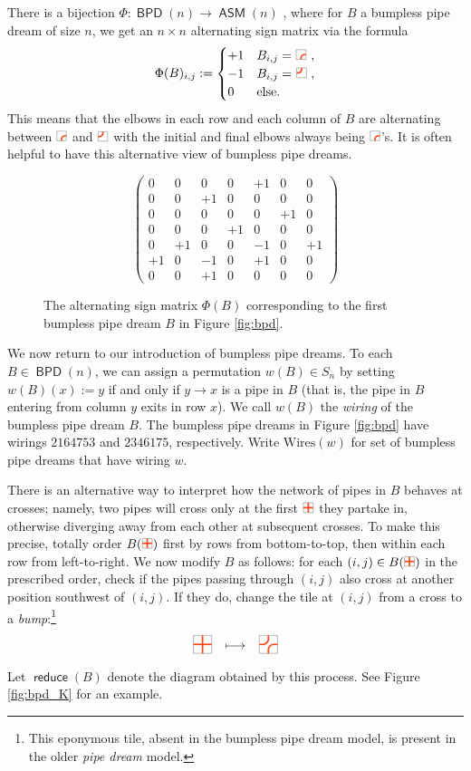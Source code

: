 \documentclass[11pt]{article}
\theoremstyle{definition}
\numberwithin{equation}{section}
\DeclareMathOperator{\reduce}{\mathsf{reduce}}
\DeclareMathOperator{\ASM}{\mathsf{ASM}}
\DeclareMathOperator{\BPD}{\mathsf{BPD}}
\newcommand{\pipecolor}{UForange}
\newcommand{\tilescale}{0.27}
\newcommand{\bigtilescale}{0.5}
\newcommand{\drawSquare}{
    \draw[
        xshift=0.5cm,yshift=0.5cm,
        black,opacity=0.5,thin
    ] (0,0) rectangle (1,1);
}
\newcommand{\drawHorizontal}[2]{
    \draw[color=\pipecolor,very thick]
    (#1-0.5,#2) to (#1+0.5,#2);
}
\newcommand{\drawVertical}[2]{
    \draw[color=\pipecolor,very thick]
    (#1,#2-0.5) to (#1,#2+0.5);
}
\newcommand{\drawCross}[2]{
    \drawHorizontal{#1}{#2}
    \drawVertical{#1}{#2}
}
\newcommand{\drawRelbow}[2]{
    \draw[color=\pipecolor,very thick]
    (#1,#2-0.5) to (#1,#2-0.25) to[bend left] (#1+0.25,#2) to (#1+0.5,#2);
}
\newcommand{\drawJelbow}[2]{
    \draw[color=\pipecolor,very thick]
    (#1,#2+0.5) to (#1,#2+0.25) to[bend left] (#1-0.25,#2) to (#1-0.5,#2);
}
\newcommand{\drawBump}[2]{
    \drawRelbow{#1}{#2}
    \drawJelbow{#1}{#2}
}
\newcommand{\cross}[1][scale=\tilescale,baseline=4pt]{
    \begin{tikzpicture}[#1]
    \drawSquare
    \drawCross11
    \end{tikzpicture}
}
\newcommand{\relbow}[1][scale=\tilescale,baseline=4pt]{
    \begin{tikzpicture}[#1]
    \drawSquare
    \drawRelbow11
    \end{tikzpicture}
}
\newcommand{\jelbow}[1][scale=\tilescale,baseline=4pt]{
    \begin{tikzpicture}[#1]
    \drawSquare
    \drawJelbow11
    \end{tikzpicture}
}
\newcommand{\bump}[1][scale=\tilescale,baseline=4pt]{
    \begin{tikzpicture}[#1]
    \drawSquare
    \drawBump11
    \end{tikzpicture}
}
\newcommand{\bigcross}{\cross[scale=\bigtilescale]}
\newcommand{\bigbump}{\bump[scale=\bigtilescale]}
\begin{document}
There is a bijection $\Phi\colon \BPD(n) \to \ASM(n)$ \cite{Wei21},
where for $B$ a bumpless pipe dream of size $n$, we get an $n\times n$ alternating sign matrix via the formula \[
    \Phi(B)_{i,j} := \begin{cases}
        +1 & B_{i,j} = $\relbow$, \\
        -1 & B_{i,j} = $\jelbow$, \\
        0 & \text{else.}
    \end{cases}
\]
This means that the elbows in each row and each column of $B$ are alternating between $\relbow$ and $\jelbow$ with the initial and final elbows always being $\relbow$'s.
It is often helpful to have this alternative view of bumpless pipe dreams.

\begin{figure}
    \centering
    \[\begin{pmatrix}
     0& 0& 0& 0&+1& 0& 0\\
     0& 0&+1& 0& 0& 0& 0\\
     0& 0& 0& 0& 0&+1& 0\\
     0& 0& 0&+1& 0& 0& 0\\
     0&+1& 0& 0&-1& 0&+1\\
    +1& 0&-1& 0&+1& 0& 0\\
     0& 0&+1& 0& 0& 0& 0
    \end{pmatrix}\]
    \caption{The alternating sign matrix $\Phi(B)$ corresponding to the first bumpless pipe dream $B$ in Figure \ref{fig:bpd}.}
    \label{fig:asm}
\end{figure}

We now return to our introduction of bumpless pipe dreams.
To each $B\in \BPD(n)$, we can assign a permutation $w(B)\in S_n$ by setting $w(B)(x) := y$ if and only if $y\to x$ is a pipe in $B$ (that is, the pipe in $B$ entering from column $y$ exits in row $x$).
We call $w(B)$ the \textit{wiring} of the bumpless pipe dream $B$.
The bumpless pipe dreams in Figure \ref{fig:bpd} have wirings $2164753$ and $2346175$, respectively.
Write $\mbox{Wires}(w)$ for set of bumpless pipe dreams that have wiring $w$.

There is an alternative way to interpret how the network of pipes in $B$ behaves at crosses; namely, two pipes will cross only at the first $\cross$ they partake in, otherwise diverging away from each other at subsequent crosses.
To make this precise, totally order $B(\cross)$ first by rows from bottom-to-top, then within each row from left-to-right.
We now modify $B$ as follows:
for each $(i,j)\in B(\cross)$ in the prescribed order, check if the pipes passing through $(i,j)$ also cross at another position southwest of $(i,j)$.
If they do, change the tile at $(i,j)$ from a cross to a \textit{bump}:\footnote{
    This eponymous tile, absent in the bumpless pipe dream model, is present in the older \textit{pipe dream} model.
} \[
    \bigcross\quad
    \raisebox{4pt}{$\longmapsto$}\quad
    \bigbump
\]
Let $\reduce(B)$ denote the diagram obtained by this process.
See Figure \ref{fig:bpd_K} for an example.
\end{document}
